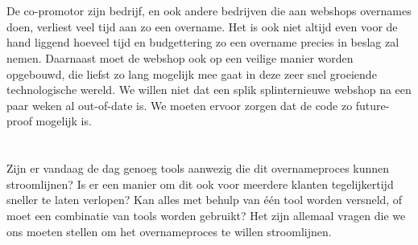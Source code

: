\section{}%
\label{sec:probleemstelling}


De co-promotor zijn bedrijf, en ook andere bedrijven die aan webshops overnames doen, verliest veel tijd aan zo een overname. Het is ook niet altijd even voor de hand liggend hoeveel tijd en budgettering zo een overname precies in beslag zal nemen. Daarnaast moet de webshop ook op een veilige manier worden opgebouwd, die liefst zo lang mogelijk mee gaat in deze zeer snel groeiende technologische wereld. We willen niet dat een splik splinternieuwe webshop na een paar weken al out-of-date is. We moeten ervoor zorgen dat de code zo future-proof mogelijk is.

\section{}%
\label{sec:onderzoeksvraag}


Zijn er vandaag de dag genoeg tools aanwezig die dit overnameproces kunnen stroomlijnen? Is er een manier om dit ook voor meerdere klanten tegelijkertijd sneller te laten verlopen? Kan alles met behulp van één tool worden versneld, of moet een combinatie van tools worden gebruikt? Het zijn allemaal vragen die we ons moeten stellen om het overnameproces te willen stroomlijnen.

